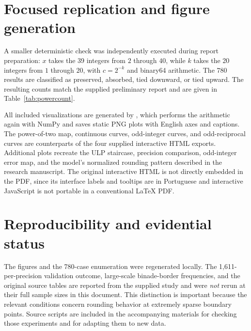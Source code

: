 \section{Focused replication and figure generation}
A smaller deterministic check was independently executed during report preparation: $x$ takes the 39 integers from $2$ through $40$, while $k$ takes the 20 integers from $1$ through $20$, with $c=2^{-k}$ and binary64 arithmetic. The 780 results are classified as preserved, absorbed, tied downward, or tied upward. The resulting counts match the supplied preliminary report and are given in Table~\ref{tab:powercount}.

All included visualizations are generated by , which performs the arithmetic again with NumPy and saves static PNG plots with English axes and captions. The power-of-two map, continuous curves, odd-integer curves, and odd-reciprocal curves are counterparts of the four supplied interactive HTML exports. Additional plots recreate the ULP staircase, precision comparison, odd-integer error map, and the model's normalized rounding pattern described in the research manuscript. The original interactive HTML is not directly embedded in the PDF, since its interface labels and tooltips are in Portuguese and interactive JavaScript is not portable in a conventional LaTeX PDF.

\section{Reproducibility and evidential status}
The figures and the 780-case enumeration were regenerated locally. The 1,611-per-precision validation outcome, large-scale binade-border frequencies, and the original source tables are reported from the supplied study and were \emph{not} rerun at their full sample sizes in this document. This distinction is important because the relevant conditions concern rounding behavior at extremely sparse boundary points. Source scripts are included in the accompanying materials for checking those experiments and for adapting them to new data.
